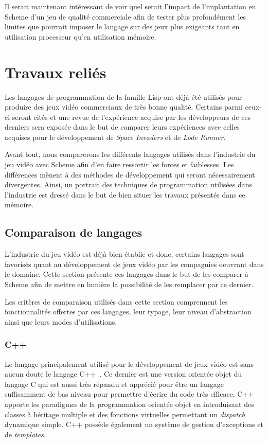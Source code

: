 \documentclass[12pt,twoside,letterpaper,francais]{book}
\begin{document}
Il serait maintenant intéressant de voir quel serait l'impact de
l'implantation en Scheme d'un jeu de qualité commerciale afin de
tester plus profondément les limites que pourrait imposer le langage
sur des jeux plus exigeants tant en utilisation processeur qu'en
utilisation mémoire.





\clearpage

\chapter{Travaux reliés}
Les langages de programmation de la famille Lisp ont déjà été utilisés
pour produire des jeux vidéo commerciaux de très bonne
qualité. Certains parmi ceux-ci seront cités et une revue de
l'expérience acquise par les développeurs de ces derniers sera exposée
dans le but de comparer leurs expériences avec celles acquises pour le
dévelop\-pement de \textit{Space Invaders} et de \textit{Lode Runner}.

Avant tout, nous comparerons les différents langages utilisés dans
l'industrie du jeu vidéo avec Scheme afin d'en faire ressortir les
forces et faiblesses. Les différences mènent à des méthodes de
dévelop\-pement qui seront nécessairement divergentes. Ainsi, un
portrait des techniques de programmation utilisées dans l'industrie
est dressé dans le but de bien situer les travaux présentés dans ce
mémoire.


\FloatBarrier
\section{Comparaison de langages}
L'industrie du jeu vidéo est déjà bien établie et donc, certains
langages sont favorisés quant au dévelop\-pement de jeux vidéo par les
compagnies oeuvrant dans le domaine. Cette section présente ces
langages dans le but de les comparer à Scheme afin de mettre en
lumière la possibilité de les remplacer par ce dernier.

Les critères de comparaison utilisés dans cette section comprennent
les fonctionnalités offertes par ces langages, leur typage, leur
niveau d'abstraction ainsi que leurs modes d'utilisations.


\FloatBarrier
\subsection{C++}
Le langage principalement utilisé pour le dévelop\-pement de jeux vidéo
est sans aucun doute le langage C++~\cite{cplusplus}. Ce dernier est
une version orientée objet du langage C\cite{Ritchie-C-dev} qui est
aussi très répandu et apprécié pour être un langage suffisamment de
bas niveau pour permettre d'écrire du code très efficace. C++ apporte
les paradigmes de la programmation orientée objet en introduisant des
classes à héritage multiple et des fonctions virtuelles permettant un
\textit{dispatch} dynamique simple. C++ possède également un système
de gestion d'exceptions et de \textit{templates}.
\end{document}
